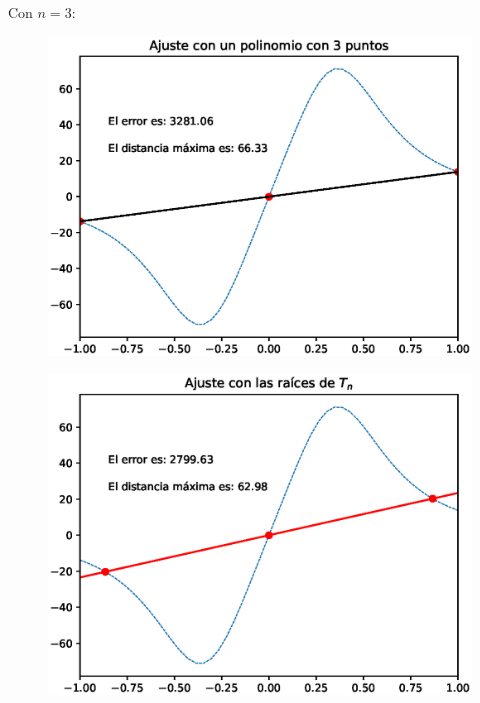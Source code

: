 \newpage

Con $n = 3$:
\\
\begin{minipage}{0.45\linewidth}
    \begin{figure}[H]
    \centering
    \includegraphics[scale=0.44]{Imagenes/Interpolacion_Chebychev_03_Polinomio.eps}
\end{figure}       
\end{minipage}
\hspace{0.1cm}
\begin{minipage}{0.45\linewidth}
\begin{figure}[H]
    \centering
    \includegraphics[scale=0.44]{Imagenes/Interpolacion_Chebychev_03_Raices.eps}
\end{figure}
\end{minipage}

